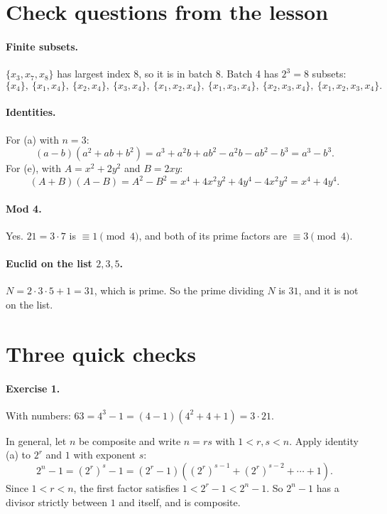 \documentclass[11pt]{article}
\begin{document}

\section*{Check questions from the lesson}

\paragraph{Finite subsets.} $\{x_3, x_7, x_8\}$ has largest index $8$, so it is in batch 8. Batch 4 has $2^3 = 8$ subsets:
\[ \{x_4\},\ \{x_1, x_4\},\ \{x_2, x_4\},\ \{x_3, x_4\},\ \{x_1, x_2, x_4\},\ \{x_1, x_3, x_4\},\ \{x_2, x_3, x_4\},\ \{x_1, x_2, x_3, x_4\}. \]

\paragraph{Identities.} For (a) with $n = 3$:
\[ (a - b)(a^2 + ab + b^2) = a^3 + a^2 b + ab^2 - a^2 b - ab^2 - b^3 = a^3 - b^3. \]
For (e), with $A = x^2 + 2y^2$ and $B = 2xy$:
\[ (A + B)(A - B) = A^2 - B^2 = x^4 + 4x^2y^2 + 4y^4 - 4x^2y^2 = x^4 + 4y^4. \]

\paragraph{Mod 4.} Yes. $21 = 3 \cdot 7$ is $\equiv 1 \pmod 4$, and both of its prime factors are $\equiv 3 \pmod 4$.

\paragraph{Euclid on the list $2, 3, 5$.} $N = 2 \cdot 3 \cdot 5 + 1 = 31$, which is prime. So the prime dividing $N$ is $31$, and it is not on the list.

\section*{Three quick checks}

\paragraph{Exercise 1.} With numbers: $63 = 4^3 - 1 = (4 - 1)(4^2 + 4 + 1) = 3 \cdot 21$.

In general, let $n$ be composite and write $n = rs$ with $1 < r, s < n$. Apply identity (a) to $2^r$ and $1$ with exponent $s$:
\[ 2^n - 1 = (2^r)^s - 1 = (2^r - 1)\left((2^r)^{s-1} + (2^r)^{s-2} + \cdots + 1\right). \]
Since $1 < r < n$, the first factor satisfies $1 < 2^r - 1 < 2^n - 1$. So $2^n - 1$ has a divisor strictly between $1$ and itself, and is composite.
\end{document}

